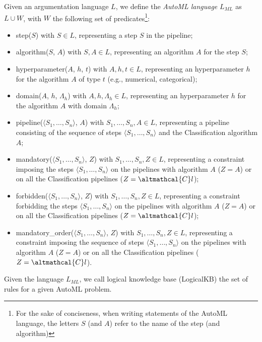 \begin{definition}
Given an argumentation language $L$, we define the \emph{AutoML language} $L_{ML}$ as $L \cup W$, with $W$ the following set of predicates\footnote{For the sake of conciseness, when writing statements of the AutoML language, the letters $S$ (and $A$) refer to the name of the step (and algorithm)}:
\begin{itemize}
    \item step($S$) with $S \in L$, representing a step $S$ in the pipeline;
    \item algorithm($S$, $A$) with $S, A \in L$, representing an algorithm $A$ for the step $S$;
    \item hyperparameter($A$, $h$, $t$) with $A, h, t \in L$, representing an hyperparameter $h$ for the algorithm $A$ of type $t$ (e.g., numerical, categorical);
    \item domain($A$, $h$, $\Lambda_h$) with $A, h, \Lambda_h \in L$, representing an hyperparameter $h$ for the algorithm $A$ with domain $\Lambda_h$;
    \item pipeline($\langle S_1, \ldots, S_n \rangle$, $A$) with $S_1, \ldots, S_n, A \in L$, representing a pipeline consisting of the sequence of steps $\langle S_1, \ldots, S_n \rangle$ and the Classification algorithm $A$;
    \item mandatory($\langle S_1, \ldots, S_n \rangle$, $Z$) with $S_1, \ldots, S_n, Z \in L$, representing a constraint imposing the steps $\langle S_1, \ldots, S_n \rangle$ on the pipelines with algorithm $A$ ($Z = A$) or on all the Classification pipelines ($Z = \altmathcal{C}l$);
    \item forbidden($\langle S_1, \ldots, S_n \rangle$, $Z$) with $S_1, \ldots, S_n, Z \in L$, representing a constraint forbidding the steps $\langle S_1, \ldots, S_n \rangle$ on the pipelines with algorithm $A$ ($Z = A$) or on all the Classification pipelines ($Z = \altmathcal{C}l$);
    \item mandatory\_order($\langle S_1, \ldots, S_n \rangle$, $Z$) with $S_1, \ldots, S_n, Z \in L$, representing a constraint imposing the sequence of steps $\langle S_1, \ldots, S_n \rangle$ on the pipelines with algorithm $A$ ($Z = A$) or on all the Classification pipelines ($Z = \altmathcal{C}l$).
\end{itemize}
\end{definition}

\begin{definition}
Given the language $L_{ML}$, we call logical knowledge base (LogicalKB) the set of rules for a given AutoML problem.
\end{definition}


